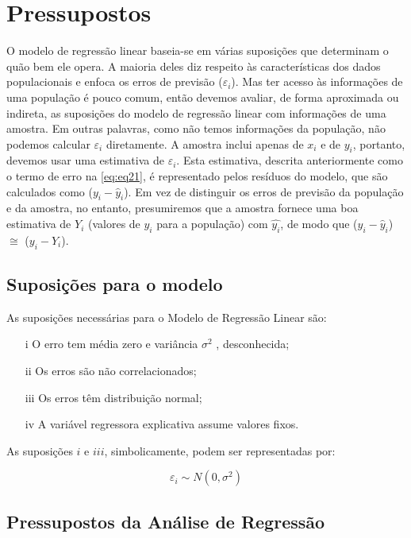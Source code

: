 \chapter{Pressupostos}
\label{ch:pressupostos}

\noindent O modelo de regressão linear baseia-se em várias suposições que determinam o quão bem ele opera. A maioria deles diz respeito às características dos dados populacionais e enfoca os erros de previsão ($\varepsilon_i$). Mas ter acesso às informações de uma população é pouco comum, então devemos avaliar, de forma aproximada ou indireta, as suposições do modelo de regressão linear com informações de uma amostra. Em outras palavras, como não temos informações da população, não podemos calcular $\varepsilon_i$ diretamente. A amostra inclui apenas de $x_i$ e de $y_i$, portanto, devemos usar uma estimativa de $\varepsilon_i$. Esta estimativa, descrita anteriormente como o termo de erro na \autoref{eq:eq21}, é representado pelos resíduos do modelo, que são calculados como ($y_i - \hat{y}_i$). Em vez de distinguir os erros de previsão da população e da amostra, no entanto, presumiremos que a amostra fornece uma boa estimativa de $Y_i$ (valores de $y_i$ para a população)  com $\hat{y_i}$, de modo que ($y_i - \hat{y}_i$) $\cong$ ($y_i - Y_i$).

\section{Suposições para o modelo}

\noindent As suposições necessárias para o Modelo de Regressão Linear são:

\begin{itemize}
    \item[i] O erro tem média zero e variância $\sigma ^2$ , desconhecida;
    \item[ii] Os erros são não correlacionados;
    \item[iii] Os erros têm distribuição normal;
    \item[iv] A variável regressora explicativa assume valores fixos.
\end{itemize}


\noindent As suposições $i$ e $iii$, simbolicamente, podem ser representadas por:  

\begin{equation}
\label{eq:erro}
    \varepsilon _i \sim N(0,\sigma^2)
\end{equation}

\section{Pressupostos da Análise de Regressão}

